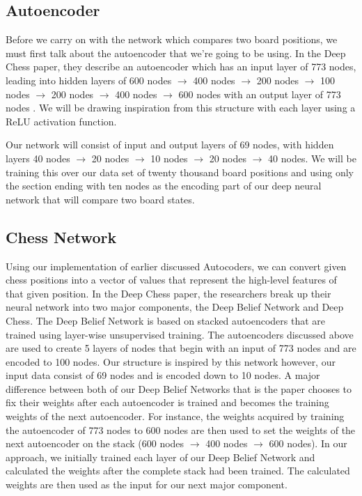 \documentclass[12pt]{article}
\begin{document}
    \subsection{Autoencoder}

    Before we carry on with the network which compares two board positions, we must first talk about the autoencoder that we're going to be using. In the Deep Chess paper, they describe an autoencoder which has an input layer of 773 nodes, leading into hidden layers of 600 nodes $\rightarrow$ 400 nodes $\rightarrow$ 200 nodes $\rightarrow$ 100 nodes $\rightarrow$ 200 nodes $\rightarrow$ 400 nodes $\rightarrow$ 600 nodes with an output layer of 773 nodes \cite{deepchess}. We will be drawing inspiration from this structure with each layer using a ReLU activation function. 

    Our network will consist of input and output layers of 69 nodes, with hidden layers 40 nodes $\rightarrow$ 20 nodes $\rightarrow$ 10 nodes $\rightarrow$ 20 nodes $\rightarrow$ 40 nodes. We will be training this over our data set of twenty thousand board positions and using only the section ending with ten nodes as the encoding part of our deep neural network that will compare two board states. 

    \subsection{Chess Network}

    Using our implementation of earlier discussed Autocoders, we can convert given chess positions into a vector of values that represent the high-level features of that given position. In the Deep Chess paper, the researchers break up their neural network into two major components, the Deep Belief Network and Deep Chess. The Deep Belief Network is based on stacked autoencoders that are trained using layer-wise unsupervised training. The autoencoders discussed above are used to create 5 layers of nodes that begin with an input of 773 nodes and are encoded to 100 nodes. Our structure is inspired by this network however, our input data consist of 69 nodes and is encoded down to 10 nodes. A major difference between both of our Deep Belief Networks that is the paper chooses to fix their weights after each autoencoder is trained and becomes the training weights of the next autoencoder. For instance, the weights acquired by training the autoencoder of 773 nodes to 600 nodes are then used to set the weights of the next autoencoder on the stack (600 nodes $\rightarrow$ 400 nodes $\rightarrow$ 600 nodes). In our approach, we initially trained each layer of our Deep Belief Network and calculated the weights after the complete stack had been trained. The calculated weights are then used as the input for our next major component.
\end{document}

